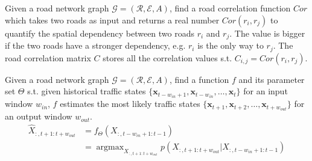 \begin{problem}
    Given a road network graph $\mathcal{G}=(\mathcal{R}, \mathcal{E}, A)$, find a road correlation function $Cor$ which takes two roads as input and returns a real number $Cor(r_i, r_j)$ to quantify the spatial dependency between two roads $r_i$ and $r_j$. The value is bigger if the two roads have a stronger dependency, e.g. $r_i$ is the only way to $r_j$. The road correlation matrix $C$ stores all the correlation values s.t. $C_{i, j}=Cor(r_i, r_j)$.
\end{problem}

\begin{problem}
    Given a road network graph $\mathcal{G}=(\mathcal{R}, \mathcal{E}, A)$, find a function $f$ and its parameter set $\Theta$ s.t. given historical traffic states $\{\mathbf{x}_{t-w_{in}+1}, \mathbf{x}_{t-w_{in}}, \dots, \mathbf{x}_t \}$ for an input window $w_{in}$, $f$ estimates the most likely traffic states $\{\mathbf{x}_{t+1}, \mathbf{x}_{t+2}, \dots, \mathbf{x}_{t+w_{out}} \}$ for an output window $w_{out}$.
    \begin{equation}
        \begin{aligned}
            \hat X_{:, t+1:t+w_{out}}&=f_\Theta(X_{:, t-w_{in}+1:t-1})\\&=\mathop{\arg\max}_{X_{:, t+1:t+w_{out}}} p(X_{:, t+1:t+w_{out}}|X_{:, t-w_{in}+1:t-1})
        \end{aligned}
    \end{equation}
\end{problem}

